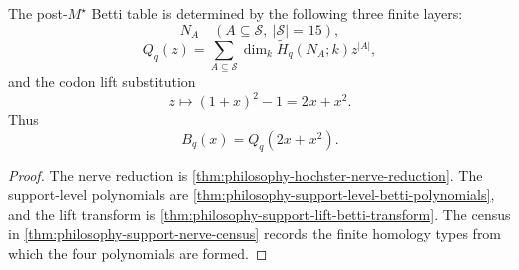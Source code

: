\begin{theorem}
\label{thm:philosophy-support-nerve-census-theorem}
The post-$M^{\star}$ Betti table is determined by the following three
finite layers:
$$
  N_{A}
  \quad
  (A\subseteq\mathcal{S},\ |\mathcal{S}|=15),
$$
$$
  Q_{q}(z)
  =
  \sum_{A\subseteq\mathcal{S}}
  \dim_{k}\widetilde{H}_{q}(N_{A};k)z^{|A|},
$$
and the codon lift substitution
$$
  z\mapsto (1+x)^{2}-1=2x+x^{2}.
$$
Thus
$$
  B_{q}(x)=Q_{q}(2x+x^{2}).
$$
\end{theorem}
\begin{proof}
The nerve reduction is
\autoref{thm:philosophy-hochster-nerve-reduction}. The support-level
polynomials are
\autoref{thm:philosophy-support-level-betti-polynomials}, and the
lift transform is \autoref{thm:philosophy-support-lift-betti-transform}.
The census in \autoref{thm:philosophy-support-nerve-census} records
the finite homology types from which the four polynomials are formed.
\end{proof}

